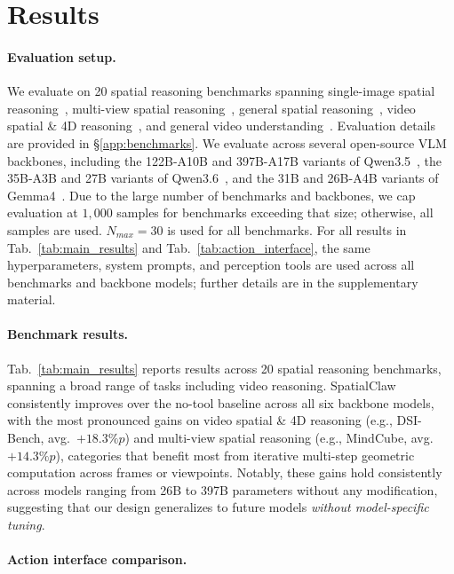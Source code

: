 \documentclass{llmxive}
\providecommand{\ours}{SpatialClaw}
\providecommand{\paragrapht}{\paragraph}
\begin{document}
\section{Results}

\paragrapht{Evaluation setup.}
We evaluate on 20 spatial reasoning benchmarks spanning single-image spatial reasoning~\citep{team2025gemini,marsili2025visual,jia2025omnispatial,xu2025spbench}, multi-view spatial reasoning~\citep{yin2025mindcube,yang2025mmsi,zhang2025from}, general spatial reasoning~\citep{fu2024blink,xiao2025spatialtree,li2025viewspatial}, video spatial \& 4D reasoning~\citep{lin2025mmsivideo,wu2025osibench,zhou2025paibench,brown2025shortcuts,fan2025vlm,zhang2025dsibench}, and general video understanding~\citep{zhu2025cvbench,li2026perceptioncomp,fu2025video,videommev2_2026}. 
Evaluation details are provided in \S\ref{app:benchmarks}.
We evaluate across several open-source VLM backbones, including the 122B-A10B and 397B-A17B variants of Qwen3.5~\citep{qwen3.5}, the 35B-A3B and 27B variants of Qwen3.6~\citep{qwen3.6-27b}, and the 31B and 26B-A4B variants of Gemma4~\citep{gemma4}. 
Due to the large number of benchmarks and backbones, we cap evaluation at $1,000$ samples for benchmarks exceeding that size; otherwise, all samples are used. $N_{max}=30$ is used for all benchmarks.
For all results in Tab.~\ref{tab:main_results} and Tab.~\ref{tab:action_interface}, the same hyperparameters, system prompts, and perception tools are used across all benchmarks and backbone models; further details are in the supplementary material.

\paragrapht{Benchmark results.}
\label{sec:main_results}
Tab.~\ref{tab:main_results} reports results across 20 spatial reasoning benchmarks, spanning a broad range of tasks including video reasoning.
\ours{} consistently improves over the no-tool baseline across all six backbone models, with the most pronounced gains on video spatial \& 4D reasoning (e.g., DSI-Bench, avg.\ $+18.3\%p$) and multi-view spatial reasoning (e.g., MindCube, avg.\ $+14.3\%p$), categories that benefit most from iterative multi-step geometric computation across frames or viewpoints.
Notably, these gains hold consistently across models ranging from 26B to 397B parameters without any modification, suggesting that our design generalizes to future models \textit{without model-specific tuning}.

\paragrapht{Action interface comparison.}
\label{sec:abl_action}
\end{document}
